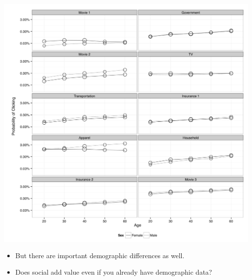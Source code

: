 \documentclass[aspectratio=169]{beamer}
\begin{document}
\begin{frame}

\begin{center}
\includegraphics[height=0.6\textheight]{figures/goel_predicting_2014_figa2}
\end{center}

\vfill

\begin{itemize}
\item But there are important demographic differences as well. \pause
\item Does social add value even if you already have demographic data?
\end{itemize}

\end{frame}
\end{document}
